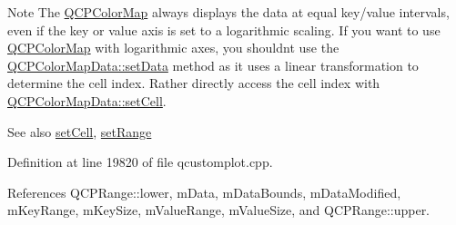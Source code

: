\begin{DoxyNote}{Note}
The \hyperlink{class_q_c_p_color_map}{Q\+C\+P\+Color\+Map} always displays the data at equal key/value intervals, even if the key or value axis is set to a logarithmic scaling. If you want to use \hyperlink{class_q_c_p_color_map}{Q\+C\+P\+Color\+Map} with logarithmic axes, you shouldn\textquotesingle{}t use the \hyperlink{class_q_c_p_color_map_data_afd2083ccfd6987ec94aa7ef8e91ca39a}{Q\+C\+P\+Color\+Map\+Data\+::set\+Data} method as it uses a linear transformation to determine the cell index. Rather directly access the cell index with \hyperlink{class_q_c_p_color_map_data_a8e75eaf8746596319032a93f3d2d0683}{Q\+C\+P\+Color\+Map\+Data\+::set\+Cell}.
\end{DoxyNote}
\begin{DoxySeeAlso}{See also}
\hyperlink{class_q_c_p_color_map_data_a8e75eaf8746596319032a93f3d2d0683}{set\+Cell}, \hyperlink{class_q_c_p_color_map_data_aad9c1c7c703c1339489fc730517c83d4}{set\+Range} 
\end{DoxySeeAlso}


Definition at line 19820 of file qcustomplot.\+cpp.



References Q\+C\+P\+Range\+::lower, m\+Data, m\+Data\+Bounds, m\+Data\+Modified, m\+Key\+Range, m\+Key\+Size, m\+Value\+Range, m\+Value\+Size, and Q\+C\+P\+Range\+::upper.


